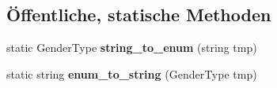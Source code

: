 \subsection*{Öffentliche, statische Methoden}
\begin{DoxyCompactItemize}
\item 
\mbox{\label{classContactManager_1_1Person_a6e34834e33216b4f63cfd01e48fd4100}} 
static Gender\+Type {\bfseries string\+\_\+to\+\_\+enum} (string tmp)
\item 
\mbox{\label{classContactManager_1_1Person_af42d024a7727dbef67e049f1dec012a9}} 
static string {\bfseries enum\+\_\+to\+\_\+string} (Gender\+Type tmp)
\end{DoxyCompactItemize}
